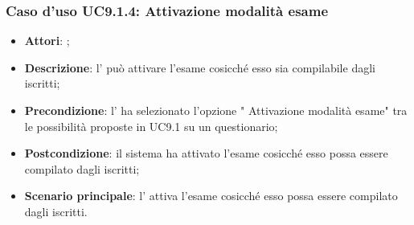 		\subsubsection{Caso d'uso UC9.1.4: Attivazione modalità esame}
		\label{UC9.1.4}
		\begin{itemize}
			\item \textbf{Attori}: \uaupro{};
			\item \textbf{Descrizione}: l'\uaupro{} può attivare l'esame cosicché esso sia compilabile dagli \uau iscritti;
			\item \textbf{Precondizione}: l'\uaupro{} ha selezionato l'opzione " Attivazione modalità esame" tra le possibilità proposte in UC9.1 su un questionario;
			\item \textbf{Postcondizione}: il sistema ha attivato l'esame cosicché esso possa essere compilato dagli \uaus iscritti;
			\item \textbf{Scenario principale}: l'\uaupro{} attiva l'esame cosicché esso possa essere compilato dagli \uaus iscritti.
		\end{itemize}
										
